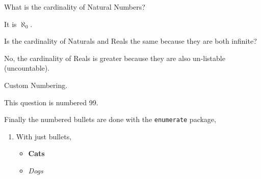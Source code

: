 \documentclass{homework}
\begin{document}
\begin{question}
What is the cardinality of Natural Numbers?

It is \(\aleph_0\).
\end{question}

\begin{question}
Is the cardinality of Naturals and Reals the same because they are both infinite?

No, the cardinality of Reals is greater because they are also un-listable (uncountable).
\end{question}

\begin{question}[99]
Custom Numbering.

This question is numbered 99.
\end{question}

\begin{question}
Finally the numbered bullets are done with the \texttt{enumerate} package,

\begin{enumerate}
\item With just bullets,
\begin{itemize}
\item \textbf{Cats}
\item \emph{Dogs}
\end{itemize}
\end{enumerate}
\end{question}
\end{document}
